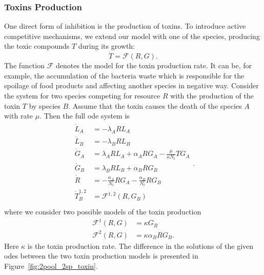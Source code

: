 \documentclass[10pt,A4paper]{article}
\numberwithin{equation}{section}
\begin{document}
\subsubsection{Toxins Production}
One direct form of inhibition is the production of toxins.
To introduce active competitive mechanisms, we extend our model with one of the species, producing the toxic compounds $T$ during its growth:
\begin{equation}
    \dot{T} = \mathcal{F}(R,G).
\end{equation}
The function $\mathcal{F}$ denotes the model for the toxin production rate.
It can be, for example, the accumulation of the bacteria waste which is responsible for the spoilage of food products and affecting another species in negative way.
Consider the system for two species competing for resource $R$ with the production of the toxin $T$ by species $B$.
Assume that the toxin causes the death of the species $A$ with rate $\mu$.
Then the full \ac{ode} system is
\begin{align}
    \begin{split}
        \dot{L}_A &= - \lambda_A R L_A\\
        \dot{L}_B &= - \lambda_B R L_B \\
        \dot{G}_A &= \lambda_A R L_A + \alpha_A R G_A - \frac{\mu}{\kappa N_t} T G_A\\
        \dot{G}_B &= \lambda_B R L_B + \alpha_B R G_B\\ 
        \dot{R} &= -\frac{\alpha_A}{N_t} R G_A-\frac{\alpha_B}{N_t} R G_B\\
        \dot{T}_{B}^{1,2} &= \mathcal{F}^{1,2} (R, G_B) \\
    \end{split}.
    \label{eq:model_2sp_toxin}
\end{align}
%
where we consider two possible models of the toxin production
\begin{align}
    \mathcal{F}^1(R,G)&=\kappa G_B\\
    \mathcal{F}^2(R,G)&=\kappa\alpha_B R G_B.
\end{align}
Here $\kappa$ is the toxin production rate.
The difference in the solutions of the given \acp{ode} between the two toxin production models is presented in Figure~\ref{fig:2pool_2sp_toxin}.
%
%
\end{document}
